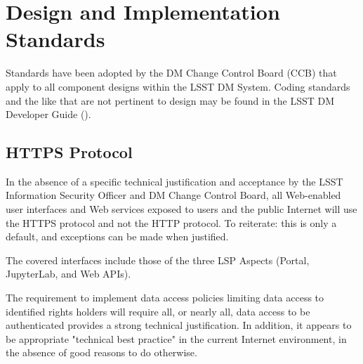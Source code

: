 \section{Design and Implementation Standards}\label{design-implementation-standards}

Standards have been adopted by the DM Change Control Board (CCB) that apply to
all component designs within the LSST DM System.  Coding standards and the like
that are not pertinent to design may be found in the LSST DM Developer Guide
(\citep{DevGuide}).

\subsection{HTTPS Protocol}

In the absence of a specific technical justification and acceptance by the LSST
Information Security Officer and DM Change Control Board, all Web-enabled user
interfaces and Web services exposed to users and the public Internet will use
the HTTPS protocol and not the HTTP protocol.  To reiterate: this is only a
default, and exceptions can be made when justified.

The covered interfaces include those of the three LSP Aspects (Portal,
JupyterLab, and Web APIs).

The requirement to implement data access policies limiting data access to
identified rights holders will require all, or nearly all, data access to be
authenticated provides a strong technical justification.  In addition, it
appears to be appropriate "technical best practice" in the current Internet
environment, in the absence of good reasons to do otherwise.
